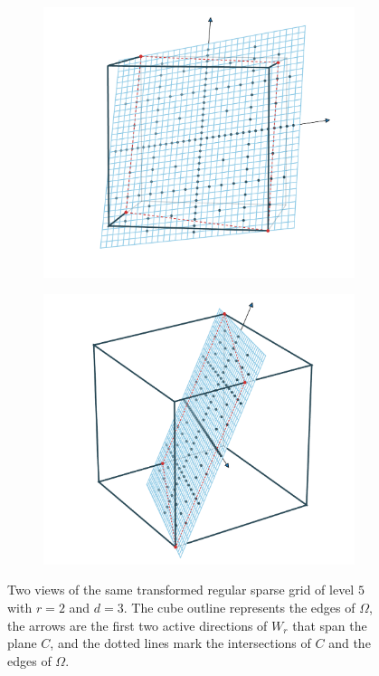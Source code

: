 \documentclass[
  a4paper,  %
  twoside,  %
  bibliography=totoc,
  headsepline,
  cleardoublepage=empty,
  parskip=half,
  draft=false
]{scrbook}
\begin{document}
\newpage
\begin{mdframed}[style=style]
\vspace{2.5mm}
\begin{figure}[H]
\begin{subfigure}{.5\textwidth}
  \centering
  \includegraphics[width=\linewidth]{graphics/surrogate_vis_2}
\end{subfigure}%
\begin{subfigure}{.5\textwidth}
  \centering
  \includegraphics[width=\linewidth]{graphics/surrogate_vis_1}
\end{subfigure}
\vspace{2.5mm}
\delimit
\caption{Two views of the same transformed regular sparse grid of level $5$ with $r=2$ and $d=3$.
The \darkblue cube outline represents the edges of $\Omega$, the arrows are the first two active directions of $W_r$ that span the plane $C$, and the dotted \red lines mark the intersections of $C$ and the edges of $\Omega$.}
\label{fig:trans_vis}
\end{figure}
\end{mdframed}
\end{document}
